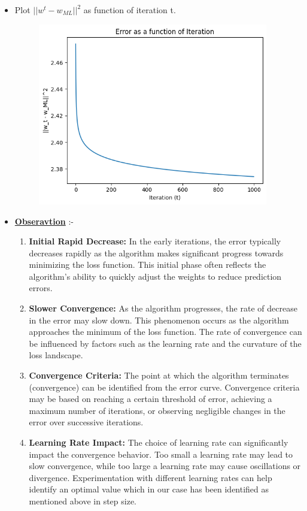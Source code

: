 \documentclass[12pt, a4paper]{article}
\begin{document}
\begin{itemize}
    \item \large Plot \(||w^t-w_{ML}||^2\) as function of iteration t.
    \begin{figure}[ht]
        \centering
        \includegraphics[width=0.95\textwidth]{Gradient_descent}
        \caption{}
        \label{fig:mesh1}
    \end{figure}
    \newpage
    \item \large \textbf{\underline{Obseravtion}} :-
    \begin{enumerate}
        \item \textbf{Initial Rapid Decrease:} In the early iterations, the error typically decreases rapidly as the algorithm makes significant progress towards minimizing the loss function. This initial phase often reflects the algorithm's ability to quickly adjust the weights to reduce prediction errors.
        \item \textbf{Slower Convergence:} As the algorithm progresses, the rate of decrease in the error may slow down. This phenomenon occurs as the algorithm approaches the minimum of the loss function. The rate of convergence can be influenced by factors such as the learning rate and the curvature of the loss landscape.
        \item \textbf{Convergence Criteria:} The point at which the algorithm terminates (convergence) can be identified from the error curve. Convergence criteria may be based on reaching a certain threshold of error, achieving a maximum number of iterations, or observing negligible changes in the error over successive iterations.
        \item \textbf{Learning Rate Impact:} The choice of learning rate can significantly impact the convergence behavior. Too small a learning rate may lead to slow convergence, while too large a learning rate may cause oscillations or divergence. Experimentation with different learning rates can help identify an optimal value which in our case has been identified as mentioned above in step size. 
    \end{enumerate}
\end{itemize}
\end{document}

